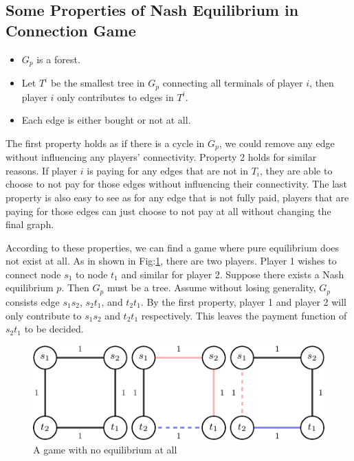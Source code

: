 \documentclass[11pt,psfig,times]{article}
\begin{document}
\subsection{Some Properties of Nash Equilibrium in Connection Game}
\begin{itemize}
	\item \(G_p\) is a forest.
	\item Let \(T^i\) be the smallest tree in \(G_p\) connecting all terminals of player \(i\), then player \(i\) only contributes to edges in \(T^i\).
	\item Each edge is either bought or not at all. 
\end{itemize}
The first property holds as if there is a cycle in $G_p$, we could remove any edge without influencing any players' connectivity. Property 2 holds for similar reasons. If player $i$ is paying for any edges that are not in $T_i$, they are able to choose to not pay for those edges without influencing their connectivity. The last property is also easy to see as for any edge that is not fully paid, players that are paying for those edges can just choose to not pay at all without changing the final graph. 

According to these properties, we can find a game where pure equilibrium does not exist at all. As in shown in Fig:\ref{fig:noequi}, there are two players. Player 1 wishes to connect node $s_1$ to node $t_1$ and similar for player 2. Suppose there exists a Nash equilibrium $p$. Then $G_p$ must be a tree. Assume without losing generality, $G_p$ consists edge $s_1s_2$, $s_2t_1$, and $t_2t_1$. By the first property, player 1 and player 2 will only contribute to $s_1s_2$ and $t_2t_1$ respectively. This leaves the payment function of $s_2t_1$ to be decided. 

\begin{figure}[H]
	\begin{center}
	\includegraphics{pictures/noequi.pdf}
	\end{center}
	\caption{A game with no equilibrium at all}
	\label{fig:noequi}
\end{figure}
\end{document}
